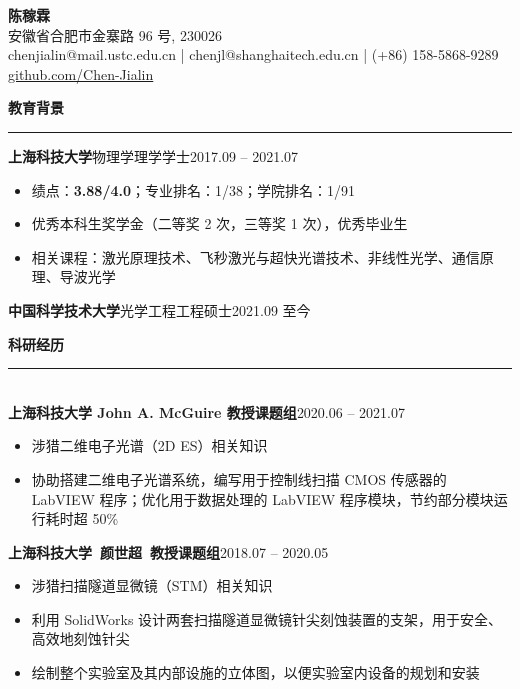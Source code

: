\documentclass[letterpaper,11pt]{article}
\begin{document}
\begin{center}
    {\LARGE\bfseries{}陈稼霖}\\
    \vspace{1ex}
    安徽省合肥市金寨路 96 号, 230026\\
    chenjialin@mail.ustc.edu.cn | chenjl@shanghaitech.edu.cn | (+86) 158-5868-9289\\
    \href{https://github.com/Chen-Jialin}{github.com/Chen-Jialin}\\
\end{center}

{\Large\bfseries{}教育背景}\\
\rule[1.5ex]{\textwidth}{1pt}
{\songti\large\bfseries{}上海科技大学}{\large\quad{}物理学\quad{}理学学士}\hfill{2017.09 -- 2021.07}\\
\vspace{-4ex}
\begin{itemize}
    \item 绩点：{\bfseries{}3.88/4.0}；专业排名：1/38；学院排名：1/91
    \item 优秀本科生奖学金（二等奖 2 次，三等奖 1 次），优秀毕业生
    \item 相关课程：激光原理技术、飞秒激光与超快光谱技术、非线性光学、通信原理、导波光学
\end{itemize}
{\songti\large\bfseries{}中国科学技术大学}{\large\quad{}光学工程\quad{}工程硕士}\hfill{2021.09 至今}\\
\vspace{-1ex}%

{\Large\bfseries{}科研经历}\\
\rule[1.5ex]{\columnwidth}{1pt}\\
{\songti\large\bfseries{}上海科技大学 John A. McGuire 教授课题组}\hfill{2020.06 -- 2021.07}\\
\vspace{-4ex}
\begin{itemize}
    \item 涉猎二维电子光谱（2D ES）相关知识
    \item 协助搭建二维电子光谱系统，编写用于控制线扫描 CMOS 传感器的 LabVIEW 程序；优化用于数据处理的 LabVIEW 程序模块，节约部分模块运行耗时超 50\%
\end{itemize}
{\songti\large\bfseries{}上海科技大学~颜世超~教授课题组}\hfill{2018.07 -- 2020.05}\\
\vspace{-4ex}
\begin{itemize}
    \item 涉猎扫描隧道显微镜（STM）相关知识
    \item 利用 SolidWorks 设计两套扫描隧道显微镜针尖刻蚀装置的支架，用于安全、高效地刻蚀针尖
    \item 绘制整个实验室及其内部设施的立体图，以便实验室内设备的规划和安装
\end{itemize}
\vspace{1ex}
\end{document}
